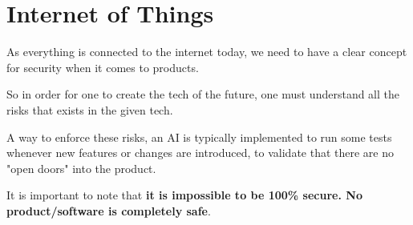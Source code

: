 \section{Internet of Things}
\begin{flushleft}
As everything is connected to the internet today, we need to have a clear concept for security when it comes to products.

So in order for one to create the tech of the future, one must understand all the risks that exists in the given tech.

A way to enforce these risks, an AI is typically implemented to run some tests whenever new features or changes are introduced, to validate that there are no "open doors" into the product.

It is important to note that \textbf{it is impossible to be 100\% secure. No product/software is completely safe}.
\end{flushleft}
